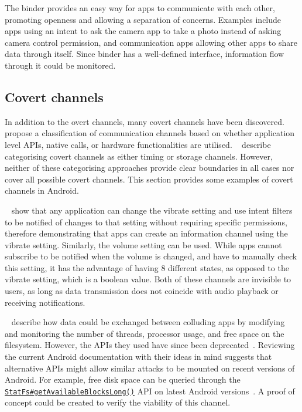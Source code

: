 \documentclass[article, oneside]{aaltoseries}
\renewcommand\Gls\cGls
\begin{document}
The binder provides an easy way for apps to communicate with each other, promoting openness and allowing a separation of concerns. Examples include apps using an intent to ask the camera app to take a photo instead of asking camera control permission, and communication apps allowing other apps to share data through itself. Since binder has a well-defined interface, information flow through it could be monitored.

\subsection{Covert channels}
\label{sec:covert}

In addition to the overt channels, many covert channels have been discovered. \citeauthor{Marforio2012}~\cite{Marforio2012} propose a classification of communication channels based on whether application level APIs, \Gls{os} native calls, or hardware functionalities are utilised. \citeauthor{Al-Haiqi2014}~\cite{Al-Haiqi2014} describe categorising covert channels as either timing or storage channels. However, neither of these categorising approaches provide clear boundaries in all cases nor cover all possible covert channels. This section provides some examples of covert channels in Android.

\citeauthor{Schlegel2011}~\cite{Schlegel2011} show that any application can change the vibrate setting and use intent filters to be notified of changes to that setting without requiring specific permissions, therefore demonstrating that apps can create an information channel using the vibrate setting. Similarly, the volume setting can be used. While apps cannot subscribe to be notified when the volume is changed, and have to manually check this setting, it has the advantage of having 8 different states, as opposed to the vibrate setting, which is a boolean value. Both of these channels are invisible to users, as long as data transmission does not coincide with audio playback or receiving notifications.

\citeauthor{Marforio2012}~\cite{Marforio2012} describe how data could be exchanged between colluding apps by modifying and monitoring the number of threads, processor usage, and free space on the filesystem. However, the APIs they used have since been deprecated~\cite{nn2017}. Reviewing the current Android documentation with their ideas in mind suggests that alternative APIs might allow similar attacks to be mounted on recent versions of Android. For example, free disk space can be queried through the \href{https://developer.android.com/reference/android/os/StatFs.html#getAvailableBlocksLong()}{\texttt{StatFs\#getAvailableBlocksLong()}} API on latest Android versions~\cite{AOSPdeveloper}. A proof of concept could be created to verify the viability of this channel.
\end{document}
